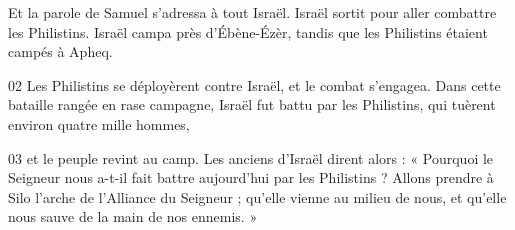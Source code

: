 Et la parole de Samuel s’adressa à tout Israël. Israël sortit pour aller combattre les Philistins. Israël campa près d’Ébène-Ézèr, tandis que les Philistins étaient campés à Apheq.

02 Les Philistins se déployèrent contre Israël, et le combat s’engagea. Dans cette bataille rangée en rase campagne, Israël fut battu par les Philistins, qui tuèrent environ quatre mille hommes,

03 et le peuple revint au camp. Les anciens d’Israël dirent alors : « Pourquoi le Seigneur nous a-t-il fait battre aujourd’hui par les Philistins ? Allons prendre à Silo l’arche de l’Alliance du Seigneur ; qu’elle vienne au milieu de nous, et qu’elle nous sauve de la main de nos ennemis. »

